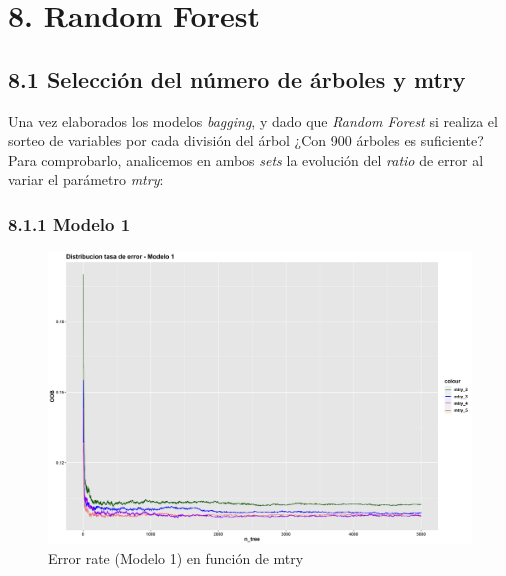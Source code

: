 \documentclass[
]{article}
\begin{document}
\hypertarget{random-forest}{%
\section{8. Random Forest}\label{random-forest}}

\hypertarget{selecciuxf3n-del-nuxfamero-de-uxe1rboles-y-mtry}{%
\subsection{8.1 Selección del número de árboles y
mtry}\label{selecciuxf3n-del-nuxfamero-de-uxe1rboles-y-mtry}}

Una vez elaborados los modelos \emph{bagging}, y dado que \emph{Random
Forest} si realiza el sorteo de variables por cada división del árbol
¿Con 900 árboles es suficiente? Para comprobarlo, analicemos en ambos
\emph{sets} la evolución del \emph{ratio} de error al variar el
parámetro \emph{mtry}:

\hypertarget{modelo-1-1}{%
\subsubsection{8.1.1 Modelo 1}\label{modelo-1-1}}

\begin{figure}[h!]

{\centering \includegraphics[width=0.99\linewidth,height=0.99\textheight,]{./charts/random_forest/error_rates/error_rate_1} 

}

\caption{Error rate (Modelo 1) en función de mtry}\label{fig:unnamed-chunk-85}
\end{figure}
\end{document}
